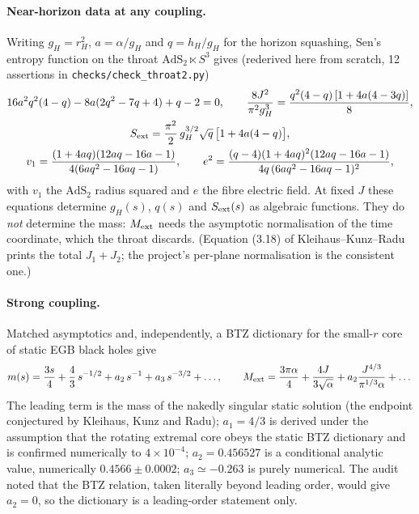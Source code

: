 \paragraph{Near-horizon data at any coupling.} Writing $g_H=r_H^2$, $a=\alpha/g_H$ and
$q=h_H/g_H$ for the horizon squashing, Sen's entropy function on the throat
$\mathrm{AdS}_2\ltimes S^3$ gives (rederived here from scratch, 12 assertions in
\texttt{checks/check\_throat2.py})
\begin{gather}
 16a^2q^2(4-q)-8a(2q^2-7q+4)+q-2=0,\qquad
 \frac{8J^2}{\pi^2g_H^3}=\frac{q^2(4-q)\,[1+4a(4-3q)]}{8},\label{eq:throat}\\
 S_{\rm ext}=\frac{\pi^2}{2}\,g_H^{3/2}\sqrt q\,\bigl[1+4a(4-q)\bigr],\nonumber\\
 v_1=\frac{(1+4aq)(12aq-16a-1)}{4(6aq^2-16aq-1)},\qquad
 e^2=\frac{(q-4)(1+4aq)^2(12aq-16a-1)}{4q\,(6aq^2-16aq-1)^2},\nonumber
\end{gather}
with $v_1$ the $\mathrm{AdS}_2$ radius squared and $e$ the fibre electric field. At fixed $J$
these equations determine $g_H(s)$, $q(s)$ and $S_{\rm ext}(s)$ as algebraic functions. They do
\emph{not} determine the mass: $M_{\rm ext}$ needs the asymptotic normalisation of the time
coordinate, which the throat discards. (Equation (3.18) of Kleihaus--Kunz--Radu prints the total
$J_1+J_2$; the project's per-plane normalisation is the consistent one.)

\paragraph{Strong coupling.} Matched asymptotics and, independently, a BTZ dictionary for the
small-$r$ core of static EGB black holes give
\begin{equation}
 m(s)=\frac{3s}{4}+\frac43\,s^{-1/2}+a_2\,s^{-1}+a_3\,s^{-3/2}+\dots,\qquad
 M_{\rm ext}=\frac{3\pi\alpha}{4}+\frac{4J}{3\sqrt\alpha}+a_2\frac{J^{4/3}}{\pi^{1/3}\alpha}+\dots
\end{equation}
The leading term is the mass of the nakedly singular static solution (the endpoint conjectured
by Kleihaus, Kunz and Radu); $a_1=4/3$ is derived under the assumption that the rotating
extremal core obeys the static BTZ dictionary and is confirmed numerically to $4\times10^{-4}$;
$a_2=0.456527$ is a conditional analytic value, numerically $0.4566\pm0.0002$; $a_3\simeq-0.263$
is purely numerical. The audit noted that the BTZ relation, taken literally beyond leading
order, would give $a_2=0$, so the dictionary is a leading-order statement only.


